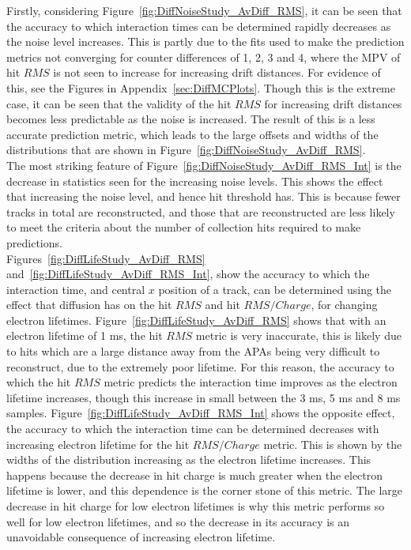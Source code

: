 Firstly, considering Figure~\ref{fig:DiffNoiseStudy_AvDiff_RMS}, it can be seen that the accuracy to which interaction times can be determined rapidly decreases as the noise level increases. This is partly due to the fits used to make the prediction metrics not converging for counter differences of 1, 2, 3 and 4, where the MPV of hit $RMS$ is not seen to increase for increasing drift distances. For evidence of this, see the Figures in Appendix~\ref{sec:DiffMCPlots}. Though this is the extreme case, it can be seen that the validity of the hit $RMS$ for increasing drift distances becomes less predictable as the noise is increased. The result of this is a less accurate prediction metric, which leads to the large offsets and widths of the distributions that are shown in Figure~\ref{fig:DiffNoiseStudy_AvDiff_RMS}.\\

The most striking feature of Figure~\ref{fig:DiffNoiseStudy_AvDiff_RMS_Int} is the decrease in statistics seen for the increasing noise levels. This shows the effect that increasing the noise level, and hence hit threshold has. This is because fewer tracks in total are reconstructed, and those that are reconstructed are less likely to meet the criteria about the number of collection hits required to make predictions. \\

Figures~\ref{fig:DiffLifeStudy_AvDiff_RMS} and~\ref{fig:DiffLifeStudy_AvDiff_RMS_Int}, show the accuracy to which the interaction time, and central $x$ position of a track, can be determined using the effect that diffusion has on the hit $RMS$ and hit $RMS/Charge$, for changing electron lifetimes. Figure~\ref{fig:DiffLifeStudy_AvDiff_RMS} shows that with an electron lifetime of 1 ms, the hit $RMS$ metric is very inaccurate, this is likely due to hits which are a large distance away from the APAs being very difficult to reconstruct, due to the extremely poor lifetime. For this reason, the accuracy to which the hit $RMS$ metric predicts the interaction time improves as the electron lifetime increases, though this increase in small between the 3 ms, 5 ms and 8 ms samples. Figure~\ref{fig:DiffLifeStudy_AvDiff_RMS_Int} shows the opposite effect, the accuracy to which the interaction time can be determined decreases with increasing electron lifetime for the hit $RMS/Charge$ metric. This is shown by the widths of the distribution increasing as the electron lifetime increases. This happens because the decrease in hit charge is much greater when the electron lifetime is lower, and this dependence is the corner stone of this metric. The large decrease in hit charge for low electron lifetimes is why this metric performs so well for low electron lifetimes, and so the decrease in its accuracy is an unavoidable consequence of increasing electron lifetime. \\

